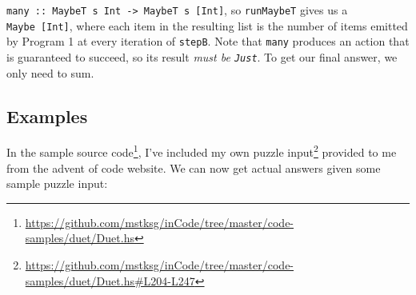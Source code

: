 \documentclass[]{article}
\newenvironment{Shaded}{}{}
\newcommand{\CharTok}[1]{\textcolor[rgb]{0.25,0.44,0.63}{#1}}
\newcommand{\CommentTok}[1]{\textcolor[rgb]{0.38,0.63,0.69}{\textit{#1}}}
\newcommand{\DataTypeTok}[1]{\textcolor[rgb]{0.56,0.13,0.00}{#1}}
\newcommand{\DecValTok}[1]{\textcolor[rgb]{0.25,0.63,0.44}{#1}}
\newcommand{\FunctionTok}[1]{\textcolor[rgb]{0.02,0.16,0.49}{#1}}
\newcommand{\KeywordTok}[1]{\textcolor[rgb]{0.00,0.44,0.13}{\textbf{#1}}}
\newcommand{\NormalTok}[1]{#1}
\newcommand{\OtherTok}[1]{\textcolor[rgb]{0.00,0.44,0.13}{#1}}
\newcommand{\StringTok}[1]{\textcolor[rgb]{0.25,0.44,0.63}{#1}}
\renewcommand{\href}[2]{#2\footnote{\url{#1}}}
\begin{document}
\begin{Shaded}
\end{Shaded}

\texttt{many\ ::\ MaybeT\ s\ Int\ -\textgreater{}\ MaybeT\ s\ {[}Int{]}}, so
\texttt{runMaybeT} gives us a \texttt{Maybe\ {[}Int{]}}, where each item in the
resulting list is the number of items emitted by Program 1 at every iteration of
\texttt{stepB}. Note that \texttt{many} produces an action that is guaranteed to
succeed, so its result \emph{must be \texttt{Just}}. To get our final answer, we
only need to sum.

\hypertarget{examples}{%
\subsection{Examples}\label{examples}}

In the
\href{https://github.com/mstksg/inCode/tree/master/code-samples/duet/Duet.hs}{sample
source code}, I've included
\href{https://github.com/mstksg/inCode/tree/master/code-samples/duet/Duet.hs\#L204-L247}{my
own puzzle input} provided to me from the advent of code website. We can now get
actual answers given some sample puzzle input:

\begin{Shaded}
\end{Shaded}
\end{document}
